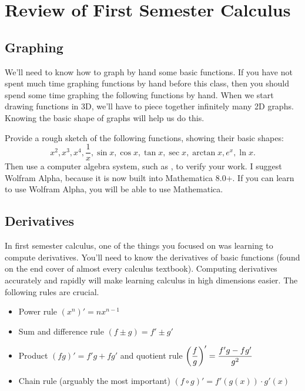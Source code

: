 
\normalsize

\section[Review of First Semester Calculus]{Review of First Semester Calculus}
\subsection{Graphing}
We'll need to know how to graph by hand some basic functions. If you have not spent much time graphing functions by hand before this class, then you should spend some time graphing the following functions by hand. When we start drawing functions in 3D, we'll have to piece together infinitely many 2D graphs.  Knowing the basic shape of graphs will help us do this.
\begin{problem}\label{firstreview}
Provide a rough sketch of the following functions, showing their basic shapes:
$$\displaystyle x^2, x^3, x^4, \frac{1}{x}, \sin x, \cos x, \tan x, \sec x, \arctan x, e^x,\ln x.$$ 
Then use a computer algebra system, such as \wolfA, to verify your work. I suggest Wolfram Alpha, because it is now built into Mathematica 8.0+.  If you can learn to use Wolfram Alpha, you will be able to use Mathematica. 
\end{problem}


\subsection{Derivatives}
In first semester calculus, one of the things you focused on was learning to compute derivatives. You'll need to know the derivatives of basic functions (found on the end cover of almost every calculus textbook). Computing derivatives accurately and rapidly will make learning calculus in high dimensions easier.
The following rules are crucial.
\begin{itemize}
\item Power rule {$(x^n)' = nx^{n-1}$}
\item Sum and difference rule {$(f\pm g) = f'\pm g'$}
\item Product {$(fg)' = f' g + fg'$} and quotient rule  {$\displaystyle\left(\frac f g\right)' = \frac{f' g - fg'}{g^2}$}
\item Chain rule (arguably the most important) {$(f\circ g)' = f'(g(x))\cdot g'(x)$}
\end{itemize}

